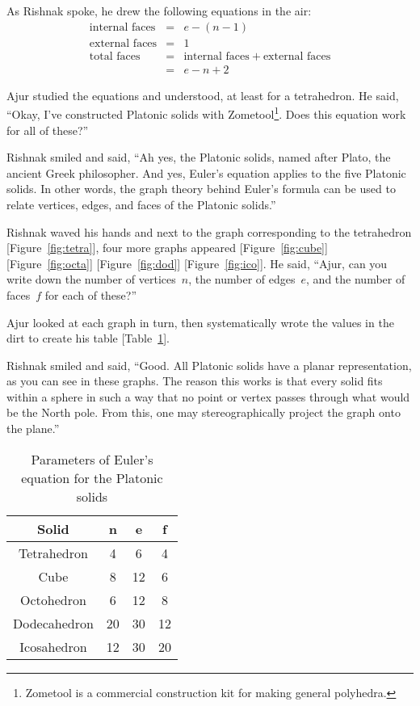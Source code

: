 As Rishnak spoke, he drew the following equations in the air:
\begin{eqnarray}
    \label{eqn:cycles}
    \text{internal faces}&=&e-(n-1)\nonumber\\
    \text{external faces}&=&1 \nonumber \\
    \text{total faces}&=& \text{internal faces}~+~\text{external faces} \nonumber \\
    &=&e-n+2
\end{eqnarray}

Ajur studied the equations and understood, at least for a tetrahedron. He said, ``Okay, I've constructed Platonic solids with Zometool\footnote{Zometool is a commercial construction kit for making general polyhedra.}. Does this equation work for all of these?''

Rishnak smiled and said, ``Ah yes, the Platonic solids, named after Plato, the ancient Greek philosopher. And yes, Euler's equation applies to the five Platonic solids. In other words, the graph theory behind Euler's formula can be used to relate vertices, edges, and faces of the Platonic solids.''

Rishnak waved his hands and next to the graph corresponding to the tetrahedron [Figure~\ref{fig:tetra}], four more graphs appeared [Figure~\ref{fig:cube}] [Figure~\ref{fig:octa}] [Figure~\ref{fig:dod}] [Figure~\ref{fig:ico}]. He said, ``Ajur, can you write down the number of vertices~$n$, the number of edges~$e$, and the number of faces~$f$ for each of these?''

Ajur looked at each graph in turn, then systematically wrote the values in the dirt to create his table [Table~\ref{tab:platonic}].

Rishnak smiled and said, ``Good. All Platonic solids have a planar representation, as you can see in these graphs. The reason this works is that every solid fits within a sphere in such a way that no point or vertex passes through what would be the North pole. From this, one may stereographically project the graph onto the plane.''

\vspace{0.2in}
\begin{table}[ht]
    \centering
    \begin{tabular}{||c|c|c|c||}
    \hline
    Solid & n & e& f \\ [0.5ex] 
 \hline\hline
 Tetrahedron& 4 & 6 & 4 \\ 
 \hline
 Cube & 8 & 12 & 6 \\
 \hline
 Octohedron & 6 & 12& 8 \\
 \hline
 Dodecahedron & 20 & 30 & 12 \\
 \hline
 Icosahedron & 12 & 30 & 20 \\ [1ex] 
 \hline
 \end{tabular}
    \caption{Parameters of Euler's equation for the Platonic solids}
    \label{tab:platonic}
\end{table}

